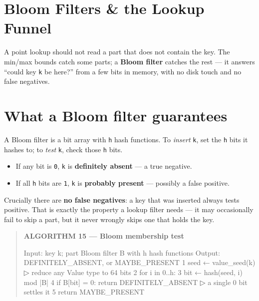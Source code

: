 \documentclass[
  11pt,
  openany]{book}
\newenvironment{Shaded}{}{}
\newcommand{\NormalTok}[1]{#1}
\providecommand{\tightlist}{%
  \setlength{\itemsep}{0pt}\setlength{\parskip}{0pt}}
\begin{document}
\section{Bloom Filters \& the Lookup
Funnel}\label{bloom-filters-the-lookup-funnel}

A point lookup should not read a part that does not contain the key. The
min/max bounds catch some parts; a \textbf{Bloom filter} catches the
rest --- it answers ``could key \texttt{k} be here?'' from a few bits in
memory, with no disk touch and no false negatives.

\section{What a Bloom filter
guarantees}\label{what-a-bloom-filter-guarantees}

A Bloom filter is a bit array with \texttt{h} hash functions. To
\emph{insert} \texttt{k}, set the \texttt{h} bits it hashes to; to
\emph{test} \texttt{k}, check those \texttt{h} bits.

\begin{itemize}
\tightlist
\item
  If any bit is \texttt{0}, \texttt{k} is \textbf{definitely absent} ---
  a true negative.
\item
  If all \texttt{h} bits are \texttt{1}, \texttt{k} is \textbf{probably
  present} --- possibly a false positive.
\end{itemize}

Crucially there are \textbf{no false negatives}: a key that was inserted
always tests positive. That is exactly the property a lookup filter
needs --- it may occasionally fail to skip a part, but it never wrongly
skips one that holds the key.

\begin{quote}
\textbf{ALGORITHM 15 --- Bloom membership test}

\begin{Shaded}
\begin{Highlighting}[]
\NormalTok{Input:  key k; part Bloom filter B with h hash functions}
\NormalTok{Output: DEFINITELY\_ABSENT, or MAYBE\_PRESENT}
\NormalTok{1  seed ← value\_seed(k)                              ▷ reduce any Value type to 64 bits}
\NormalTok{2  for i in 0..h:}
\NormalTok{3      bit ← hash(seed, i) mod |B|}
\NormalTok{4      if B[bit] = 0: return DEFINITELY\_ABSENT        ▷ a single 0 bit settles it}
\NormalTok{5  return MAYBE\_PRESENT}
\end{Highlighting}
\end{Shaded}
\end{quote}
\end{document}
